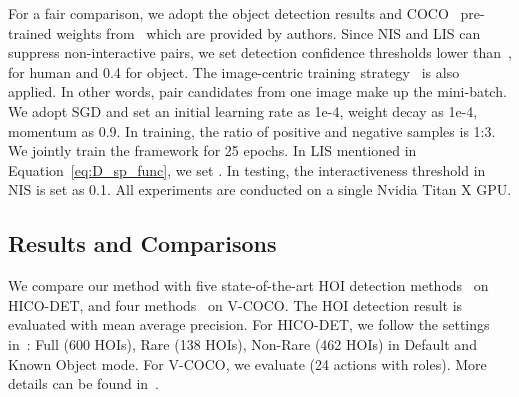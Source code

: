 \documentclass[10pt,twocolumn,letterpaper]{article}
\begin{document}
For a fair comparison, we adopt the object detection results and COCO~\cite{coco} pre-trained weights from~\cite{gao2018ican} which are provided by authors.
Since NIS and LIS can suppress non-interactive pairs, we set detection confidence thresholds lower than~\cite{gao2018ican},  for human and 0.4 for object. 
The image-centric training strategy~\cite{faster-rcnn} is also applied. In other words, pair candidates from one image make up the mini-batch. 
We adopt SGD and set an initial learning rate as 1e-4, weight decay as 1e-4, momentum as 0.9. In training, the ratio of positive and negative samples is 1:3. We jointly train the framework for 25 epochs. In LIS mentioned in Equation~\ref{eq:D_sp_func}, we set .
In testing, the interactiveness threshold  in NIS is set as 0.1. All experiments are conducted on a single Nvidia Titan X GPU.


\subsection{Results and Comparisons}
We compare our method with five state-of-the-art HOI detection methods~\cite{hicodet,Shen2018Scaling,Gkioxari2017Detecting,qi2018learning,gao2018ican} on HICO-DET, and four methods~\cite{vcoco,Gkioxari2017Detecting,qi2018learning,gao2018ican} on V-COCO.
The HOI detection result is evaluated with mean average precision. For HICO-DET, we follow the settings in~\cite{hicodet}: Full (600 HOIs), Rare (138 HOIs), Non-Rare (462 HOIs) in Default and Known Object mode. For V-COCO, we evaluate  (24 actions with roles). More details can be found in~\cite{hicodet,vcoco}. 
\begin{table}
\centering
{}
\caption{Mode settings in experiments.}
\label{tab:mode}
\vspace{-0.3cm}
\end{table}
                          
\end{document}
